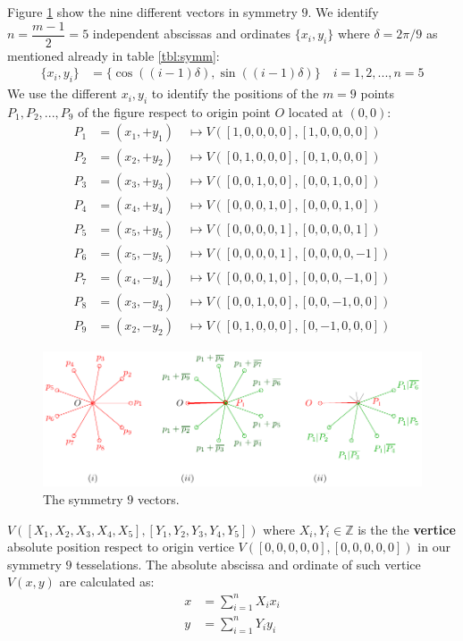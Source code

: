 \documentclass[11pt]{article}
\begin{document}
Figure \ref{fig:vectors-a} show the nine different vectors in symmetry $9$. We identify $n = \dfrac{m-1}2 = 5$ independent abscissas and ordinates $\{ x_i, y_i \}$ where $\delta = 2\pi/9$ as mentioned already in table \ref{tbl:symm}:
\begin{align}
\{ x_i, y_i \} &= \{ \cos((i-1)\delta), \sin((i-1)\delta) \} \quad i = 1,2,...,n=5
\end{align}
We use the different $x_i,y_i$ to identify the positions of the $m=9$ points $P_1,P_2,...,P_9$ of the figure respect to origin point $O$ located at $(0,0)$:
\begin{align}
P_1 &= (x_1,+y_1) \quad\mapsto V([1,0,0,0,0],[1,0,0,0,0])\\
P_2 &= (x_2,+y_2) \quad\mapsto V([0,1,0,0,0],[0,1,0,0,0])\\
P_3 &= (x_3,+y_3) \quad\mapsto V([0,0,1,0,0],[0,0,1,0,0])\\
P_4 &= (x_4,+y_4) \quad\mapsto V([0,0,0,1,0],[0,0,0,1,0])\\
P_5 &= (x_5,+y_5) \quad\mapsto V([0,0,0,0,1],[0,0,0,0,1])\\
P_6 &= (x_5,-y_5) \quad\mapsto V([0,0,0,0,1],[0,0,0,0,-1])\\
P_7 &= (x_4,-y_4) \quad\mapsto V([0,0,0,1,0],[0,0,0,-1,0])\\
P_8 &= (x_3,-y_3) \quad\mapsto V([0,0,1,0,0],[0,0,-1,0,0])\\
P_9 &= (x_2,-y_2) \quad\mapsto V([0,1,0,0,0],[0,-1,0,0,0])
\end{align}

\begin{figure}[H]
\centering
\includegraphics[scale=1]{vectors-a}
\caption{The symmetry $9$ vectors.}
\label{fig:vectors-a}
\end{figure}

$V([X_1,X_2,X_3,X_4,X_5],[Y_1,Y_2,Y_3,Y_4,Y_5])$ where $X_i,Y_i \in \mathbb{Z}$ is the the \textbf{vertice} absolute position respect to origin vertice $V([0,0,0,0,0],[0,0,0,0,0])$ in our symmetry $9$ tesselations. The absolute abscissa and ordinate of such vertice $V(x,y)$ are calculated as:
\begin{align}
x &= \sum_{i=1}^{n}X_ix_i\\
y &= \sum_{i=1}^{n}Y_iy_i
\end{align}
\end{document}
